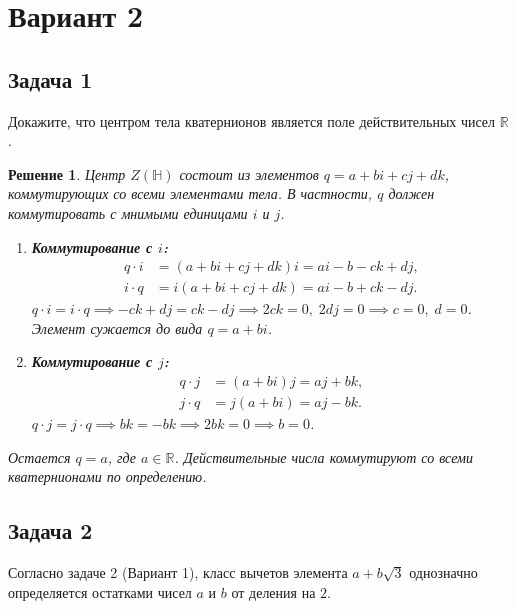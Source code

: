 \documentclass[14pt]{article}
\newtheorem*{solution}{Решение}
\begin{document}
	\newpage
	
	\section{Вариант 2}
	
	\subsection*{Задача 1}
	Докажите, что центром тела кватернионов является поле действительных чисел $\mathbb{R}$.
	
	\begin{solution}
		Центр $Z(\mathbb{H})$ состоит из элементов $q = a + bi + cj + dk$, коммутирующих со всеми элементами тела. В частности, $q$ должен коммутировать с мнимыми единицами $i$ и $j$.
		
		\begin{enumerate}
			\item \textbf{Коммутирование с $i$:}
			\begin{align*}
				q \cdot i &= (a + bi + cj + dk)i = ai - b - ck + dj, \\
				i \cdot q &= i(a + bi + cj + dk) = ai - b + ck - dj.
			\end{align*}
			$q \cdot i = i \cdot q \implies -ck + dj = ck - dj \implies 2ck = 0, \; 2dj = 0 \implies c = 0, \; d = 0$. Элемент сужается до вида $q = a + bi$.
			
			\item \textbf{Коммутирование с $j$:}
			\begin{align*}
				q \cdot j &= (a + bi)j = aj + bk, \\
				j \cdot q &= j(a + bi) = aj - bk.
			\end{align*}
			$q \cdot j = j \cdot q \implies bk = -bk \implies 2bk = 0 \implies b = 0$.
		\end{enumerate}
		
		Остается $q = a$, где $a \in \mathbb{R}$. Действительные числа коммутируют со всеми кватернионами по определению.
	\end{solution}
	
	\subsection*{Задача 2}
	Согласно задаче 2 (Вариант 1), класс вычетов элемента $a + b\sqrt{3}$ однозначно определяется остатками чисел $a$ и $b$ от деления на $2$.
	
\end{document}
